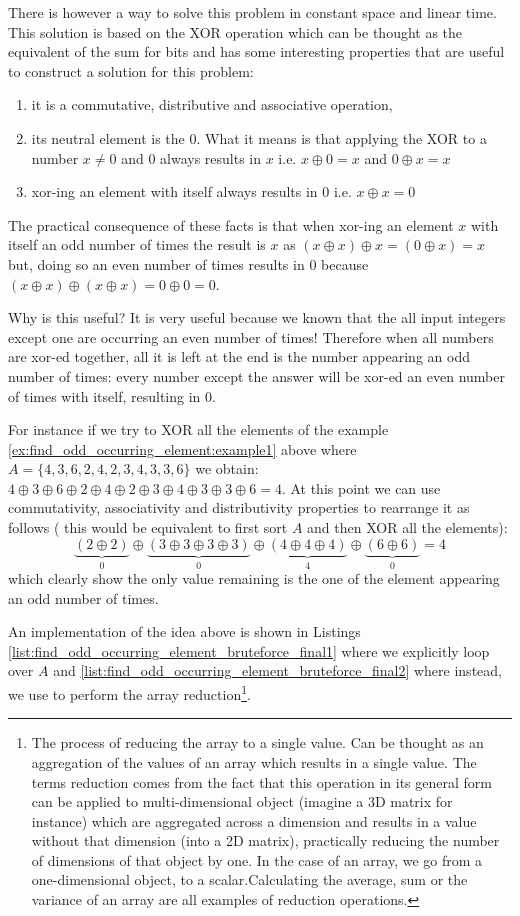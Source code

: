 There is however a way to solve this problem in constant space and linear time. 
This solution is based on the XOR operation which can be thought as the equivalent of the sum for bits and has some interesting properties that are useful to construct a solution for this problem:
\begin{enumerate}
	\item it is a commutative, distributive and associative operation,
	\item its neutral element is the $0$. What it means is that applying the XOR to a number $x \neq 0$ and $0$  always results in $x$ i.e. $x \oplus 0 = x$ and $0 \oplus x = x$
	\item xor-ing an element with itself always results in 0 i.e. $x \oplus x = 0$
\end{enumerate}
The practical consequence of these facts is that when xor-ing an element $x$ with itself an odd number of times the result is $x$ as $(x \oplus x) \oplus x  = (0 \oplus x) = x$ but, doing so an even number of times results in $0$ because  $(x \oplus x) \oplus (x \oplus x) = 0 \oplus 0 = 0$.

Why is this useful? It is very useful because we known that the all input integers except one are occurring an even number of times! Therefore when all numbers are xor-ed together, all it is left at the end is the number appearing an odd number of times: every number except the answer will be xor-ed an even number of times with itself, resulting in $0$. 

For instance if we try to XOR all the elements of the example  \ref{ex:find_odd_occurring_element:example1} above where $A=\{4,3,6,2,4,2,3,4,3,3,6\}$ we obtain: $4 \oplus 3 \oplus  6 \oplus 2 \oplus 4 \oplus 2 \oplus 3 \oplus 4 \oplus 3 \oplus 3 \oplus 6 = 4$. At this point we can use commutativity, associativity and distributivity properties to rearrange it as follows ( this would be equivalent to first sort $A$ and then XOR all the elements): 
$$\underbrace{(2 \oplus 2)}_{0} \oplus \underbrace{(3 \oplus 3 \oplus 3 \oplus 3)}_{0} \oplus \underbrace{(4 \oplus 4 \oplus 4)}_{4} \oplus \underbrace{(6 \oplus 6)}_{0} = 4$$ which clearly show the only value remaining is the one of the element appearing an odd number of times.


An implementation of the idea above is shown in Listings \ref{list:find_odd_occurring_element_bruteforce_final1} where we explicitly loop over $A$ and \ref{list:find_odd_occurring_element_bruteforce_final2} where instead, we use  to perform the array reduction\footnote{
	The process of reducing the array to a single value. Can be thought as an aggregation of the values of an array which results in a single value. The terms reduction comes from the fact that this operation in its general form can be applied to multi-dimensional object (imagine a 3D matrix for instance)  which are aggregated across a dimension and results in a value without that dimension (into a 2D matrix), practically reducing the number of dimensions of that object by one. In the case of an array, we go from a one-dimensional object, to a scalar.Calculating the average, sum or the variance of an array are all examples of reduction operations.}.

